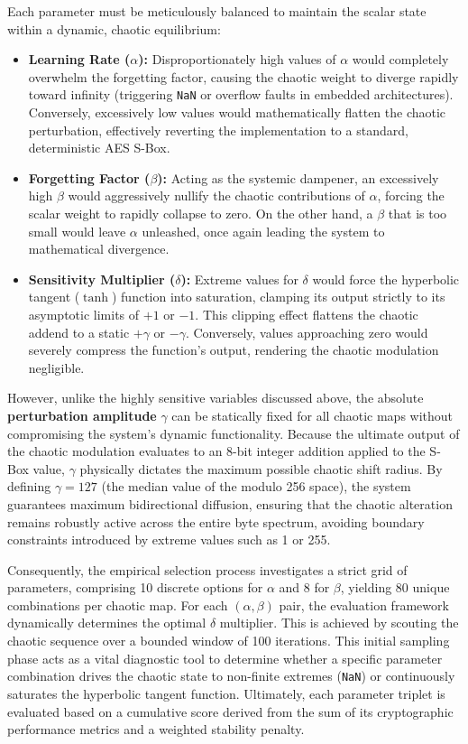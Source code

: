 \documentclass[11pt,a4paper]{report}
\begin{document}
Each parameter must be meticulously balanced to maintain the scalar state within a dynamic, chaotic equilibrium:
\begin{itemize}
    \item \textbf{Learning Rate ($\alpha$):} Disproportionately high values of $\alpha$ would completely overwhelm the forgetting factor, 
    causing the chaotic weight to diverge rapidly toward infinity (triggering \texttt{NaN} or overflow faults in embedded architectures). 
    Conversely, excessively low values would mathematically flatten the chaotic perturbation, effectively reverting the implementation to a standard, deterministic AES S-Box.
    
    \item \textbf{Forgetting Factor ($\beta$):} Acting as the systemic dampener, an excessively high $\beta$ would aggressively nullify the chaotic contributions of $\alpha$, forcing the scalar weight to rapidly collapse to zero. 
    On the other hand, a $\beta$ that is too small would leave $\alpha$ unleashed, once again leading the system to mathematical divergence.
    
    \item \textbf{Sensitivity Multiplier ($\delta$):} Extreme values for $\delta$ would force the hyperbolic tangent ($\tanh$) function into saturation, 
    clamping its output strictly to its asymptotic limits of $+1$ or $-1$. This clipping effect flattens the chaotic addend to a static $+\gamma$ or $-\gamma$. 
    Conversely, values approaching zero would severely compress the function's output, rendering the chaotic modulation negligible.
\end{itemize}

However, unlike the highly sensitive variables discussed above, the absolute \textbf{perturbation amplitude} $\gamma$ can be statically fixed for all chaotic maps without compromising the system's dynamic functionality. 
Because the ultimate output of the chaotic modulation evaluates to an 8-bit integer addition applied to the S-Box value, $\gamma$ physically dictates the maximum possible chaotic shift radius. 
By defining $\gamma = 127$ (the median value of the modulo 256 space), the system guarantees maximum bidirectional diffusion, ensuring that the chaotic alteration remains robustly active across the entire byte spectrum, avoiding boundary constraints introduced by extreme values such as 1 or 255.

Consequently, the empirical selection process investigates a strict grid of parameters, comprising 10 discrete options for $\alpha$ and 8 for $\beta$, yielding 80 unique combinations per chaotic map. 
For each $(\alpha, \beta)$ pair, the evaluation framework dynamically determines the optimal $\delta$ multiplier. This is achieved by scouting the chaotic sequence over a bounded window of 100 iterations. 
This initial sampling phase acts as a vital diagnostic tool to determine whether a specific parameter combination drives the chaotic state to non-finite extremes (\texttt{NaN}) or continuously saturates the hyperbolic tangent function. 
Ultimately, each parameter triplet is evaluated based on a cumulative score derived from the sum of its cryptographic performance metrics and a weighted stability penalty.
\end{document}
